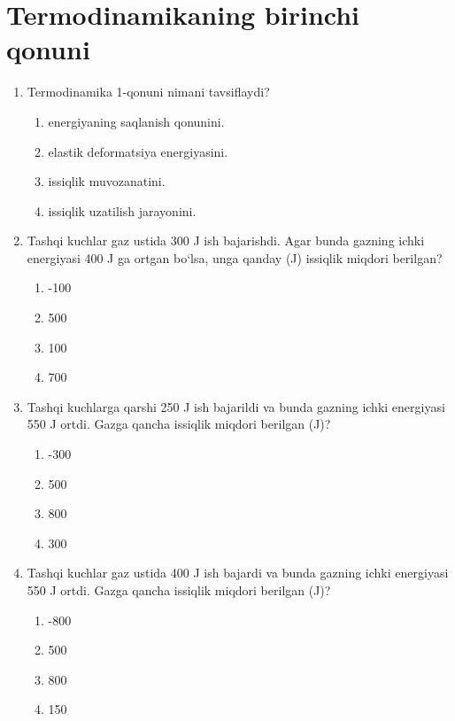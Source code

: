 \section{Termodinamikaning birinchi qonuni}



\begin{enumerate}

\item Termodinamika 1-qonuni nimani tavsiflaydi?
\begin{enumerate}[label=\Alph*)]
\item energiyaning saqlanish qonunini.
\item elastik deformatsiya energiyasini.
\item issiqlik muvozanatini.
\item issiqlik uzatilish jarayonini.
\end{enumerate}

\item Tashqi kuchlar gaz ustida 300 J ish bajarishdi. Agar bunda gazning ichki energiyasi 400 J ga ortgan bo‘lsa, unga qanday (J) issiqlik miqdori berilgan?
\begin{enumerate}[label=\Alph*)]
\item -100
\item 500
\item 100
\item 700
\end{enumerate}

\item Tashqi kuchlarga qarshi 250 J ish bajarildi va bunda gazning ichki energiyasi 550 J ortdi. Gazga qancha issiqlik miqdori berilgan (J)?
\begin{enumerate}[label=\Alph*)]
\item -300
\item 500
\item 800
\item 300
\end{enumerate}

\item Tashqi kuchlar gaz ustida 400 J ish bajardi va bunda gazning ichki energiyasi 550 J ortdi. Gazga qancha issiqlik miqdori berilgan (J)?
\begin{enumerate}[label=\Alph*)]
\item -800
\item 500
\item 800
\item 150
\end{enumerate}


\end{enumerate}
